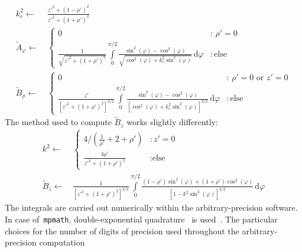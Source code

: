 \begin{align}
 k_c^2 \leftarrow&\, \frac{{z'}^2 + \left(1 - \rho'\right)^2}{{z'}^2 + \left(1 + \rho'\right)^2} \nonumber \\
 \tilde{A}_\varphi \leftarrow&\,
 \begin{cases}
   0 &:\, \rho' = 0 \\
   \frac{1}{\sqrt{{z'}^2 + \left(1 + \rho'\right)^2}}
                                 \int\limits_0^{\pi/2}
                                   \frac{\sin^2(\varphi) - \cos^2(\varphi)}
                                        {\sqrt{\cos^2(\varphi) + k_c^2 \sin^2(\varphi)}} \,\mathrm{d}\varphi &:\, \textrm{else}
 \end{cases} \label{eqn:A_phi_ref} \\
 \tilde{B}_\rho \leftarrow&\,
 \begin{cases}
   0 &:\, \rho' = 0 \textrm{ or } z' = 0 \\
   \frac{z'}{\left[{z'}^2 + \left(1 + \rho'\right)^2\right]^{3/2}}
                                 \int\limits_0^{\pi/2}
                                   \frac{\sin^2(\varphi) - \cos^2(\varphi)}
                                        {\left[\cos^2(\varphi) + k_c^2 \sin^2(\varphi)\right]^{3/2}} \,\mathrm{d}\varphi &:\, \textrm{else}
 \end{cases} \label{eqn:B_rho_ref}
\end{align}
The method used to compute $\tilde{B}_z$ works slightly differently:
\begin{align}
 k^2 \leftarrow&\,
  \begin{cases}
    4 / \left( \frac{1}{\rho'} + 2 + \rho' \right)    &: z' = 0 \\
    \frac{4 \rho'}{{z'}^2 + \left(1 + \rho'\right)^2} &: \textrm{else}
  \end{cases} \nonumber \\
 \tilde{B}_z \leftarrow&\,
   \frac{1}{\left[ {z'}^2 + \left(1 + \rho'\right)^2 \right]^{3/2} }
                                 \int\limits_0^{\pi/2}
                                   \frac{(1-\rho') \sin^2(\varphi) + (1+\rho') \cos^2(\varphi)}
                                        {\left[1 - k^2 \sin^2(\varphi) \right]^{3/2}} \,\mathrm{d}\varphi  \label{eqn:B_z_ref}
\end{align}
The integrals are carried out numerically within the arbitrary-precision software.
In case of~\texttt{mpmath}, double-exponential quadrature~\cite{double_exp_quad} is used~\cite{mpmath_quad}.
The particular choices for the number of digits of precision used throughout the arbitrary-precision computation
